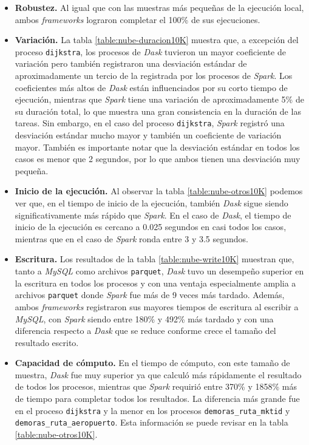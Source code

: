 \begin{itemize}
	
	\item \textbf{Robustez.} Al igual que con las muestras más pequeñas de la ejecución local, ambos \textit{frameworks} lograron completar el 100\% de sus ejecuciones.
	
	\item \textbf{Variación.} La tabla \ref{table:nube-duracion10K} muestra que, a excepción del proceso \texttt{dijkstra}, los procesos de \textit{Dask} tuvieron un mayor coeficiente de variación pero también registraron una desviación estándar de aproximadamente un tercio de la registrada por los procesos de \textit{Spark}. Los coeficientes más altos de \textit{Dask} están influenciados por su corto tiempo de ejecución, mientras que \textit{Spark} tiene una variación de aproximadamente 5\% de su duración total, lo que muestra una gran consistencia en la duración de las tareas. Sin embargo, en el caso del proceso \texttt{dijkstra}, \textit{Spark} registró una desviación estándar mucho mayor y también un coeficiente de variación mayor.  También es importante notar que la desviación estándar en todos los casos es menor que 2 segundos, por lo que ambos tienen una desviación muy pequeña. 
	
	\item \textbf{Inicio de la ejecución.} Al observar la tabla \ref{table:nube-otros10K} podemos ver que, en el tiempo de inicio de la ejecución, también \textit{Dask} sigue siendo significativamente más rápido que \textit{Spark}. En el caso de \textit{Dask}, el tiempo de inicio de la ejecución es cercano a 0.025 segundos en casi todos los casos, mientras que en el caso de \textit{Spark} ronda entre 3 y 3.5 segundos.
	
	\item \textbf{Escritura.} Los resultados de la tabla \ref{table:nube-write10K} muestran que, tanto a \textit{MySQL} como archivos \texttt{parquet}, \textit{Dask} tuvo un desempeño superior en la escritura en todos los procesos y con una ventaja especialmente amplia a archivos \texttt{parquet} donde \textit{Spark} fue más de 9 veces más tardado. Además, ambos \textit{frameworks} registraron sus mayores tiempos de escritura al escribir a \textit{MySQL}, con \textit{Spark} siendo entre 180\% y 492\% más tardado y con una diferencia respecto a \textit{Dask} que se reduce conforme crece el tamaño del resultado escrito. 
	
	\item \textbf{Capacidad de cómputo.} En el tiempo de cómputo, con este tamaño de muestra, \textit{Dask} fue muy superior ya que calculó más rápidamente el resultado de todos los procesos, mientras que \textit{Spark} requirió entre 370\% y 1858\% más de tiempo para completar todos los resultados. La diferencia más grande fue en el proceso \texttt{dijkstra} y la menor en los procesos \texttt{demoras\_ruta\_mktid} y \texttt{demoras\_ruta\_aeropuerto}. Esta información se puede revisar en la tabla \ref{table:nube-otros10K}.


\end{itemize}
